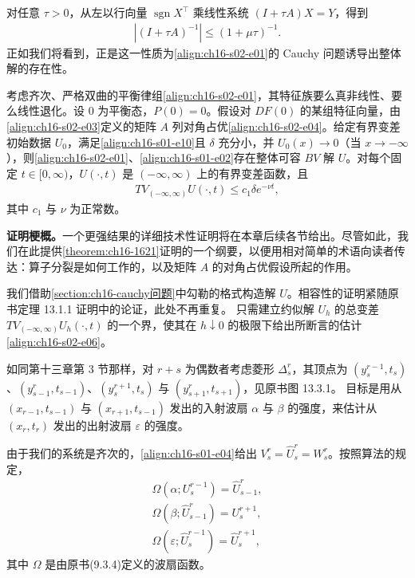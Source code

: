 \documentclass[../../main.tex]{subfiles}
\begin{document}
对任意 $\tau>0$，从左以行向量 $\operatorname{sgn}X^\top$ 乘线性系统 $(I+\tau A)X=Y$，得到
\begin{align}
|(I+\tau A)^{-1}|\leqslant(1+\mu\tau)^{-1}.
\label{align:ch16-s02-e05}
\end{align}
正如我们将看到，正是这一性质为\eqref{align:ch16-s02-e01}的 Cauchy 问题诱导出整体解的存在性。

\begin{theorem}\label{theorem:ch16-1621}
考虑齐次、严格双曲的平衡律组\eqref{align:ch16-s02-e01}，其特征族要么真非线性、要么线性退化。设 $0$ 为平衡态，$P(0)=0$。假设对 $DF(0)$ 的某组特征向量，由\eqref{align:ch16-s02-e03}定义的矩阵 $A$ 列对角占优\eqref{align:ch16-s02-e04}。给定有界变差初始数据 $U_0$，满足\eqref{align:ch16-s01-e10}且 $\delta$ 充分小，并 $U_0(x)\to0$（当 $x\to-\infty$），则\eqref{align:ch16-s02-e01}、\eqref{align:ch16-s01-e02}存在整体可容 $BV$ 解 $U$。对每个固定 $t\in[0,\infty)$，$U(\cdot,t)$ 是 $(-\infty,\infty)$ 上的有界变差函数，且
\begin{align}
TV_{(-\infty,\infty)}U(\cdot,t)\leqslant c_1\delta e^{-\nu t},
\label{align:ch16-s02-e06}
\end{align}
其中 $c_1$ 与 $\nu$ 为正常数。
\end{theorem}

\textbf{证明梗概。}一个更强结果的详细技术性证明将在本章后续各节给出。尽管如此，我们在此提供\cref{theorem:ch16-1621}证明的一个纲要，以便用相对简单的术语向读者传达：算子分裂是如何工作的，以及矩阵 $A$ 的对角占优假设所起的作用。

我们借助\cref{section:ch16-cauchy问题}中勾勒的格式构造解 $U$。相容性的证明紧随原书定理 13.1.1 证明中的论证，此处不再重复。
只需建立约似解 $U_h$ 的总变差 $TV_{(-\infty,\infty)}U_h(\cdot,t)$ 的一个界，使其在 $h\downarrow0$ 的极限下给出所断言的估计\eqref{align:ch16-s02-e06}。

如同第十三章第 3 节那样，对 $r+s$ 为偶数者考虑菱形 $\Delta_s^r$，其顶点为 $(y_s^{r-1},t_s)$、$(y_{s-1}^r,t_{s-1})$、$(y_s^{r+1},t_s)$ 与 $(y_{s+1}^r,t_{s+1})$，见原书图 13.3.1。
目标是用从 $(x_{r-1},t_{s-1})$ 与 $(x_{r+1},t_{s-1})$ 发出的入射波扇 $\alpha$ 与 $\beta$ 的强度，来估计从 $(x_r,t_r)$ 发出的出射波扇 $\varepsilon$ 的强度。

由于我们的系统是齐次的，\eqref{align:ch16-s01-e04}给出 $V_s^r=\hat U_s^r=W_s^r$。按照算法的规定，
\begin{align}
\Omega(\alpha;U_s^{r-1})=\hat U_{s-1}^r,
\label{align:ch16-s02-e07}\\
\Omega(\beta;\hat U_{s-1}^r)=U_s^{r+1},
\label{align:ch16-s02-e08}\\
\Omega(\varepsilon;\hat U_s^{r-1})=\hat U_s^{r+1},
\label{align:ch16-s02-e09}
\end{align}
其中 $\Omega$ 是由原书(9.3.4)定义的波扇函数。
\end{document}
